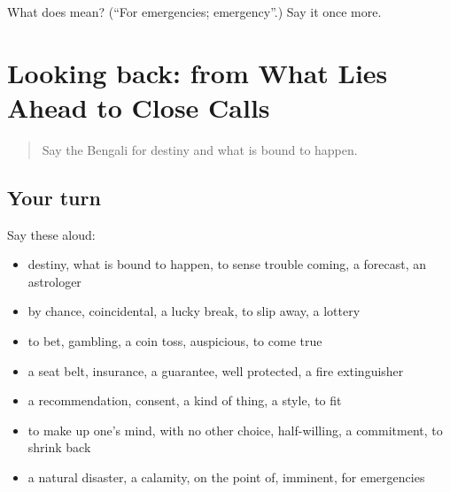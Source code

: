\begin{tcolorbox}[breakable,colback=teal!4,colframe=teal!35!black,title={Before you move on}]
What does  mean? (\textquotedblleft{}For emergencies; emergency\textquotedblright{}.) Say it once more.
\end{tcolorbox}
\section[(dialogue)]{Looking back: from What Lies Ahead to Close Calls}

\label{lesson:BN-R538-review-532-538}



\begin{quote}
Say the Bengali for destiny and what is bound to happen.
\end{quote}

\subsection*{Your turn}
Say these aloud:

\begin{itemize}
\raggedright
  \item destiny, what is bound to happen, to sense trouble coming, a forecast, an astrologer
  \item by chance, coincidental, a lucky break, to slip away, a lottery
  \item to bet, gambling, a coin toss, auspicious, to come true
  \item a seat belt, insurance, a guarantee, well protected, a fire extinguisher
  \item a recommendation, consent, a kind of thing, a style, to fit
  \item to make up one's mind, with no other choice, half-willing, a commitment, to shrink back
  \item a natural disaster, a calamity, on the point of, imminent, for emergencies
\end{itemize}

